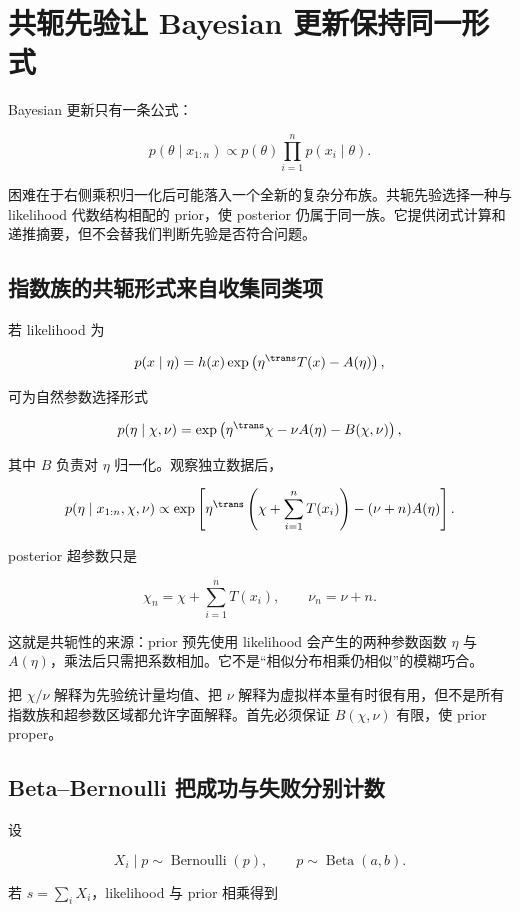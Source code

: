 \section{共轭先验让 Bayesian 更新保持同一形式}

Bayesian 更新只有一条公式：

\[
p(\theta\mid x_{1:n})
\propto
p(\theta)
\prod_{i=1}^{n}p(x_i\mid\theta).
\]

困难在于右侧乘积归一化后可能落入一个全新的复杂分布族。共轭先验选择一种与 likelihood 代数结构相配的 prior，使 posterior 仍属于同一族。它提供闭式计算和递推摘要，但不会替我们判断先验是否符合问题。

\subsection{指数族的共轭形式来自收集同类项}

若 likelihood 为

\[
p(x\mid\eta)
=h(x)
\exp\left(
\eta^{\trans}T(x)-A(\eta)
\right),
\]

可为自然参数选择形式

\[
p(\eta\mid\chi,\nu)
=\exp\left(
\eta^{\trans}\chi
-\nu A(\eta)
-B(\chi,\nu)
\right),
\]

其中 \(B\) 负责对 \(\eta\) 归一化。观察独立数据后，

\[
p(\eta\mid x_{1:n},\chi,\nu)
\propto
\exp\left[
\eta^{\trans}
\left(
\chi+\sum_{i=1}^{n}T(x_i)
\right)
-(\nu+n)A(\eta)
\right].
\]

posterior 超参数只是

\[
\chi_n
=\chi+\sum_{i=1}^{n}T(x_i),
\qquad
\nu_n=\nu+n.
\]

这就是共轭性的来源：prior 预先使用 likelihood 会产生的两种参数函数 \(\eta\) 与 \(A(\eta)\)，乘法后只需把系数相加。它不是“相似分布相乘仍相似”的模糊巧合。

把 \(\chi/\nu\) 解释为先验统计量均值、把 \(\nu\) 解释为虚拟样本量有时很有用，但不是所有指数族和超参数区域都允许字面解释。首先必须保证 \(B(\chi,\nu)\) 有限，使 prior proper。

\subsection{Beta--Bernoulli 把成功与失败分别计数}

设

\[
X_i\mid p\sim\operatorname{Bernoulli}(p),
\qquad
p\sim\operatorname{Beta}(a,b).
\]

若 \(s=\sum_iX_i\)，likelihood 与 prior 相乘得到

